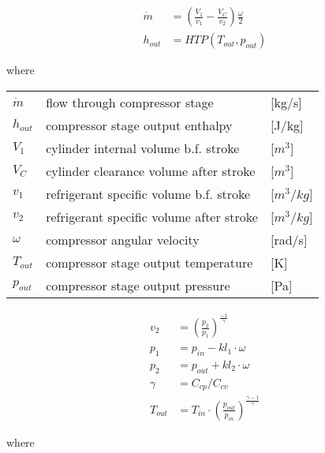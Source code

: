 \begin{align}
	\dot{m} &= \left(\frac{V_1}{v_1} - \frac{V_C}{v_2}\right) \frac{\omega}{2} \\
	h_{out} &= HTP(T_{out}, p_{out}) 
\end{align}

where

\begin{center}
	\begin{tabular}{l p{8cm} l}
		$\dot{m}$				& flow through compressor stage					& [\si{kg}/\si{s}]\\ 
		$h_{out}$				& compressor stage output enthalpy				& [\si{J}/\si{kg}]\\ 
		$V_1$					& cylinder internal volume b.f. stroke			& [$\si{m}^3$]\\ 
		$V_C$					& cylinder clearance volume after stroke		& [$\si{m}^3$]\\ 
		$v_1$					& refrigerant specific volume b.f. stroke		& [$\si{m}^3/\si{kg}$]\\
		$v_2$					& refrigerant specific volume after stroke		& [$\si{m}^3/\si{kg}$]\\
		$\omega$ 				& compressor angular velocity 					& [\si{rad}/\si{s}]\\
		$T_{out}$ 				& compressor stage output temperature 			& [\si{K}]\\
		$p_{out}$				& compressor stage output pressure 				& [\si{Pa}]\\
	\end{tabular}
\end{center}

\begin{align}
	v_2 &= \left(\frac{p_2}{p_1}\right)^{\frac{-1}{\gamma}} \\
	p_1 &= p_{in} - kl_1 \cdot \omega \\
	p_2 &= p_{out} + kl_2 \cdot \omega \\
	\gamma &= C_{cp}/C_{cv} \\
	T_{out} &= T_{in}\cdot \left(\frac{p_{out}}{p_{in}}\right)^{\frac{\gamma-1}{\gamma}}
\end{align}

where 


